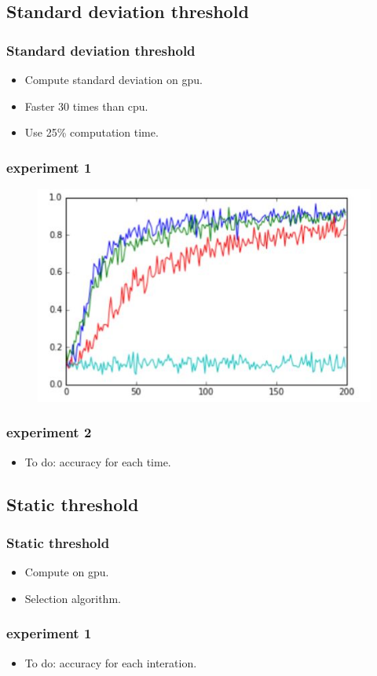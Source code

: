 \subsection{Standard deviation threshold}
\begin{frame}
	\frametitle{Standard deviation threshold}
	\begin{itemize}
		\item Compute standard deviation on gpu. 
		\item Faster 30 times than cpu.
		\item Use 25\% computation time. 
	\end{itemize}
\end{frame}
\begin{frame}
    \frametitle{experiment 1}
	\begin{figure}
		\includegraphics[scale=0.4]{figure/stdexp1.JPG}
	\end{figure}
\end{frame}

\begin{frame}
    \frametitle{experiment 2}
	\begin{itemize}
		\item To do: accuracy for each time. 
	\end{itemize}
\end{frame}

\subsection{Static threshold}
\begin{frame}
	\frametitle{Static threshold}
	\begin{itemize}
		\item Compute on gpu. 
		\item Selection algorithm. 
	\end{itemize}
\end{frame}
\begin{frame}
    \frametitle{experiment 1}
	\begin{itemize}
		\item To do: accuracy for each interation. 
	\end{itemize}
\end{frame}

